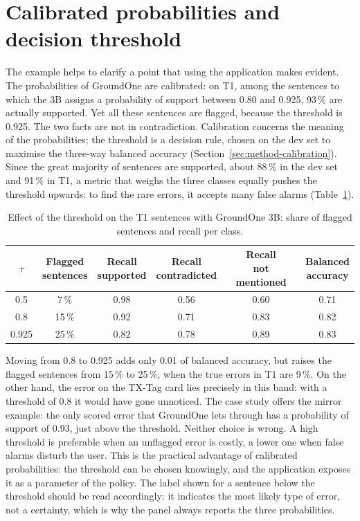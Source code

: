 \section{Calibrated probabilities and decision threshold}
\label{sec:studio-threshold}

The example helps to clarify a point that using the application makes evident. The probabilities of GroundOne are
calibrated: on T1, among the sentences to which the 3B assigns a probability of support between 0.80 and 0.925,
93\,\% are actually supported. Yet all these sentences are flagged, because the threshold is 0.925. The two facts are not
in contradiction. Calibration concerns the meaning of the probabilities; the threshold is a decision rule, chosen on the
dev set to maximise the three-way balanced accuracy (Section~\ref{sec:method-calibration}). Since the great majority of
sentences are supported, about 88\,\% in the dev set and 91\,\% in T1, a metric that weighs the three classes equally
pushes the threshold upwards: to find the rare errors, it accepts many false alarms
(Table~\ref{tab:studio-threshold}).

\begin{table}[htbp]
\centering
\caption{Effect of the threshold on the T1 sentences with GroundOne 3B: share of flagged sentences and recall per class.}
\label{tab:studio-threshold}
\small
\begin{tabular}{cccccc}
\toprule
$\tau$ & \makecell{Flagged\\sentences} & \makecell{Recall\\supported} & \makecell{Recall\\contradicted} & \makecell{Recall\\not mentioned} & \makecell{Balanced\\accuracy} \\
\midrule
0.5 & 7\,\% & 0.98 & 0.56 & 0.60 & 0.71 \\
0.8 & 15\,\% & 0.92 & 0.71 & 0.83 & 0.82 \\
0.925 & 25\,\% & 0.82 & 0.78 & 0.89 & 0.83 \\
\bottomrule
\end{tabular}
\end{table}

Moving from 0.8 to 0.925 adds only 0.01 of balanced accuracy, but raises the flagged sentences from 15\,\% to 25\,\%,
when the true errors in T1 are 9\,\%. On the other hand, the error on the TX-Tag card lies precisely in this band: with a
threshold of 0.8 it would have gone unnoticed. The case study offers the mirror example: the only scored error that GroundOne lets through has a probability of support of 0.93, just above the threshold. Neither choice is wrong. A high threshold
is preferable when an unflagged error is costly, a lower one when false alarms disturb the user. This is the practical
advantage of calibrated probabilities: the threshold can be chosen knowingly, and the application exposes it as a
parameter of the policy. The label shown for a sentence below the threshold should be read accordingly: it indicates the
most likely type of error, not a certainty, which is why the panel always reports the three probabilities.

